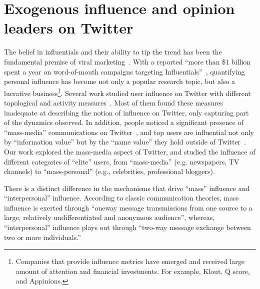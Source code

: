 \documentclass[phd,tocprelim]{cornell}
\begin{document}
\chapter{Exogenous influence and opinion leaders on Twitter}
\label{chap:influece}
The belief in influentials and their ability to tip the trend has been the fundamental premise of viral marketing~\cite{Gladwell:2002,berry-2003}.
With a reported ``more than \$1 billion spent a year on word-of-mouth campaigns targeting Influentials''~\cite{fast-company-2008}, quantifying personal influence has become not only a popular research topic, but also a lucrative  business\footnote{Companies that provide influence metrics have emerged and received large amount of attention and financial investments. For example, Klout, Q score, and Appinions.}. Several work studied user influence on Twitter with different topological and activity measures~\cite{kwak_10,Cha-2010,weng_10}. Most of them found these measures inadequate at describing the notion of influence on Twitter, only capturing part of the dynamics observed. In addition, people noticed a significant presence of ``mass-media'' communications on Twitter~\cite{kwak_10}, and top users are influential not only by ``information value'' but by the ``name value'' they hold outside of Twitter~\cite{Cha-2010}. Our work explored the mass-media aspect of Twitter, and studied the influence of different categories of ``elite'' users, from ``mass-media'' (e.g. newspapers, TV channels) to ``mass-personal'' (e.g., celebrities, professional bloggers).

There is a distinct difference in the mechanisms that drive ``mass'' influence and ``interpersonal'' influence. According to classic communication theories, mass influence is exerted through ``oneway message transmissions from one source to a large, relatively undifferentiated and anonymous audience'', whereas, ``interpersonal'' influence plays out through ``two-way message exchange between two or more individuals.''



\end{document}
